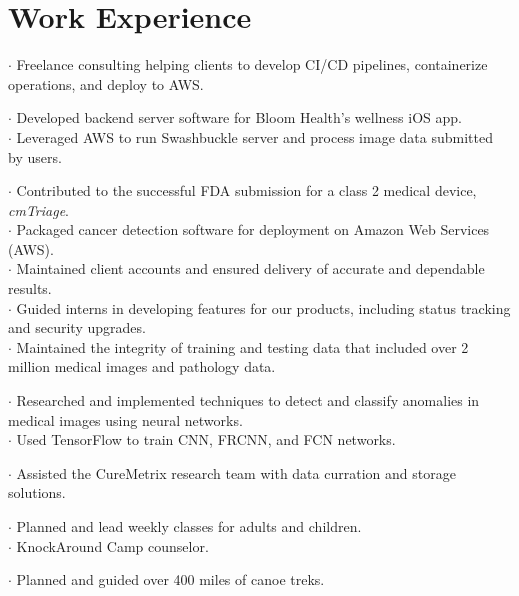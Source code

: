 \section{Work Experience}

$\cdot$ Freelance consulting helping clients to develop CI/CD pipelines, containerize operations, and deploy to AWS.

$\cdot$ Developed backend server software for Bloom Health's wellness iOS app.\\
$\cdot$ Leveraged AWS to run Swashbuckle server and process image data submitted by users.

$\cdot$ Contributed to the successful FDA submission for a class 2 medical device, {\it cmTriage}.\\
$\cdot$ Packaged cancer detection software for deployment on Amazon Web Services (AWS).\\
$\cdot$ Maintained client accounts and ensured delivery of accurate and dependable results.\\
$\cdot$ Guided interns in developing features for our products, including status tracking and security upgrades.\\
$\cdot$ Maintained the integrity of training and testing data that included over 2 million medical images and pathology data.

$\cdot$ Researched and implemented techniques to detect and classify anomalies in medical images using neural networks.\\
$\cdot$ Used TensorFlow to train CNN, FRCNN, and FCN networks.

$\cdot$ Assisted the CureMetrix research team with data curration and storage solutions.

$\cdot$ Planned and lead weekly classes for adults and children.\\
$\cdot$ KnockAround Camp counselor.

$\cdot$ Planned and guided over 400 miles of canoe treks.
